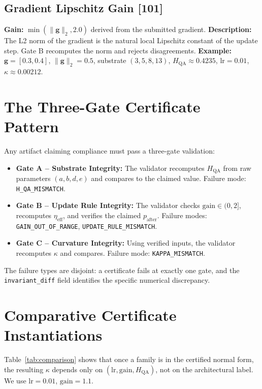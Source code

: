 \documentclass[11pt]{article}
\theoremstyle{definition}
\theoremstyle{remark}
\newcommand{\hqa}{H_{\mathrm{QA}}}
\newcommand{\etaeff}{\eta_{\mathrm{eff}}}
\begin{document}
\subsection{Gradient Lipschitz Gain [101]}
\textbf{Gain:} $\min(\|\mathbf{g}\|_2,2.0)$ derived from the submitted gradient.
\textbf{Description:} The L2 norm of the gradient is the natural local Lipschitz
constant of the update step. Gate B recomputes the norm and rejects disagreements.
\textbf{Example:} $\mathbf{g}=[0.3,0.4]$, $\|\mathbf{g}\|_2=0.5$, substrate
$(3,5,8,13)$, $\hqa\approx0.4235$, $\mathrm{lr}=0.01$, $\kappa\approx0.00212$.

\section{The Three-Gate Certificate Pattern}

Any artifact claiming compliance must pass a three-gate validation:

\begin{itemize}
  \item \textbf{Gate A -- Substrate Integrity:} The validator recomputes $\hqa$ from
    raw parameters $(a,b,d,e)$ and compares to the claimed value.
    Failure mode: \texttt{H\_QA\_MISMATCH}.

  \item \textbf{Gate B -- Update Rule Integrity:} The validator checks
    $\mathrm{gain}\in(0,2]$, recomputes $\etaeff$, and verifies the claimed
    $p_{\mathrm{after}}$.
    Failure modes: \texttt{GAIN\_OUT\_OF\_RANGE}, \texttt{UPDATE\_RULE\_MISMATCH}.

  \item \textbf{Gate C -- Curvature Integrity:} Using verified inputs, the validator
    recomputes $\kappa$ and compares.
    Failure mode: \texttt{KAPPA\_MISMATCH}.
\end{itemize}

The failure types are disjoint: a certificate fails at exactly one gate, and the
\texttt{invariant\_diff} field identifies the specific numerical discrepancy.

\section{Comparative Certificate Instantiations}
\label{sec:comparison}

Table~\ref{tab:comparison} shows that once a family is in the certified normal form,
the resulting $\kappa$ depends only on $(\mathrm{lr}, \mathrm{gain}, \hqa)$, not on
the architectural label. We use $\mathrm{lr}=0.01$, $\mathrm{gain}=1.1$.
\end{document}
